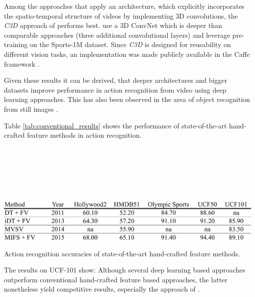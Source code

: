 Among the approaches that apply an architecture, which explicitly incorporates the spatio-temporal structure of videos by implementing 3D convolutions, the \textit{C3D} approach of \textcite{tran_learning_2015} performs best.
\textcite{tran_learning_2015} use a 3D ConvNet which is deeper than comparable approaches (three additional convolutional layers) and leverage pre-training on the Sports-1M dataset.
Since \textit{C3D} is designed for reusability on different vision tasks, an implementation was made publicly available in the Caffe framework \cite{jia_caffe:_2014}.

Given these results it can be derived, that deeper architectures and bigger datasets improve performance in action recognition from video using deep learning approaches.
This has also been observed in the area of object recognition from still images \cite{simonyan_very_2014, szegedy_going_2015, he_deep_2015}.

Table \ref{tab:conventional_results} shows the performance of state-of-the-art hand-crafted feature methods in action recognition.

\begin{minipage}[b]{.03\linewidth}
\scriptsize
\cite{wang_action_2013}\\
\cite{wang_action_2013}\\
\cite{cai_multi-view_2014}\\
\cite{lan_beyond_2015}\\
\\
\end{minipage}
\begin{minipage}[b]{.96\linewidth}
\begin{table}[H]
    \centering
    \includegraphics[width=\textwidth]{img_evaluation/conventional_results}
    \caption{Action recognition accuracies of state-of-the-art hand-crafted feature methods.}
    \label{tab:conventional_results}
\end{table}
\end{minipage}

The results on UCF-101 show: Although several deep learning based approaches outperform conventional hand-crafted feature based approaches, the latter nonetheless yield competitive results, especially the approach of \textcite{lan_beyond_2015}.

